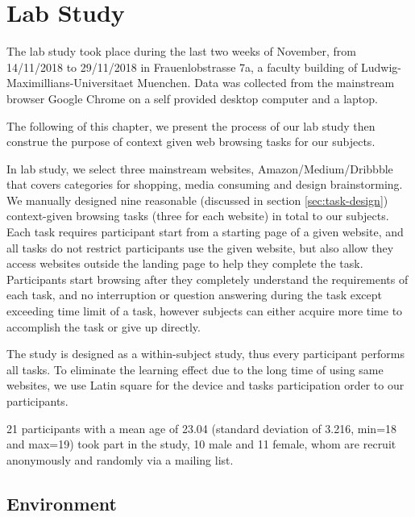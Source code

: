 \section{Lab Study}
\label{ch:exp}

The lab study took place during the last two weeks of November, from 14/11/2018 to 29/11/2018
in Frauenlobstrasse 7a, a faculty building of Ludwig-Maximillians-Universitaet Muenchen.
Data was collected from the mainstream browser Google Chrome on a self provided 
desktop computer and a laptop.

The following of this chapter, we present the process of our lab study then construe the purpose 
of context given web browsing tasks for our subjects.


In lab study, we select three mainstream websites, Amazon/Medium/Dribbble 
that covers categories for shopping, media consuming and design brainstorming. 
We manually designed nine reasonable (discussed in section \ref{sec:task-design})
context-given browsing tasks (three for each website) in total to our subjects.
Each task requires participant start from a starting page of a given website, and
all tasks do not restrict participants use the given website, but also allow they 
access websites outside the landing page to help they complete the task.
Participants start browsing after they completely understand the requirements of each task,
and no interruption or question answering during the task
except exceeding time limit of a task, however subjects can either acquire more time to accomplish
the task or give up directly.

The study is designed as a within-subject study, thus every participant performs all tasks.
To eliminate the learning effect due to the long time of using same websites, 
we use Latin square \cite{cochran1950experimental} 
for the device and tasks participation order to our participants.

21 participants with a mean age of 23.04 (standard deviation of 3.216, min=18 and max=19) 
took part in the study, 10 male and 11 female, whom are recruit anonymously and randomly via a mailing list.

\subsection{Environment}

